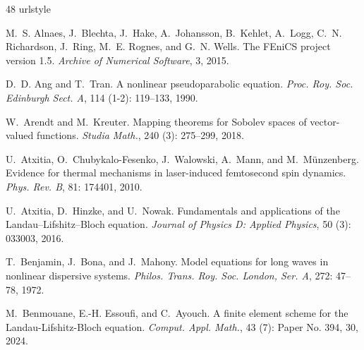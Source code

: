 \documentclass[11pt,reqno]{amsart}
\theoremstyle{definition}
\numberwithin{equation}{section}
\begin{document}
\begin{thebibliography}{48}
	\providecommand{\natexlab}[1]{#1}
	\providecommand{\url}[1]{\texttt{#1}}
	\expandafter\ifx\csname urlstyle\endcsname\relax
	\providecommand{\doi}[1]{doi: #1}\else
	\providecommand{\doi}{doi: \begingroup \urlstyle{rm}\Url}\fi
	
	M.~S. Alnaes, J.~Blechta, J.~Hake, A.~Johansson, B.~Kehlet, A.~Logg, C.~N.
	Richardson, J.~Ring, M.~E. Rognes, and G.~N. Wells.
	\newblock The {FEniCS} project version 1.5.
	\newblock \emph{Archive of Numerical Software}, 3, 2015.
	
	D.~D. Ang and T.~Tran.
	\newblock A nonlinear pseudoparabolic equation.
	\newblock \emph{Proc. Roy. Soc. Edinburgh Sect. A}, 114
	(1-2): 119--133, 1990.
	
	W.~Arendt and M.~Kreuter.
	\newblock Mapping theorems for {S}obolev spaces of vector-valued functions.
	\newblock \emph{Studia Math.}, 240 (3): 275--299, 2018.
	
	U.~Atxitia, O.~Chubykalo-Fesenko, J.~Walowski, A.~Mann, and M.~M\"unzenberg.
	\newblock Evidence for thermal mechanisms in laser-induced femtosecond spin
	dynamics.
	\newblock \emph{Phys. Rev. B}, 81: 174401, 2010.
	
	U.~Atxitia, D.~Hinzke, and U.~Nowak.
	\newblock Fundamentals and applications of the {L}andau–{L}ifshitz–{B}loch
	equation.
	\newblock \emph{Journal of Physics D: Applied Physics}, 50
	(3): 033003, 2016.
	
	T.~Benjamin, J.~Bona, and J.~Mahony.
	\newblock Model equations for long waves in nonlinear dispersive systems.
	\newblock \emph{Philos. Trans. Roy. Soc. London, Ser. A}, 272: 47--78,
	1972.
	
	M.~Benmouane, E.-H. Essoufi, and C.~Ayouch.
	\newblock A finite element scheme for the {L}andau-{L}ifshitz-{B}loch equation.
	\newblock \emph{Comput. Appl. Math.}, 43 (7): Paper No. 394,
	30, 2024.
	

\end{thebibliography}
\end{document}
